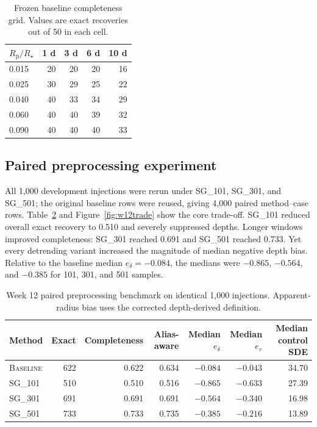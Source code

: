 \documentclass[11pt]{article}
\newcommand{\rprs}{$R_{\mathrm p}/R_\star$}
\newcommand{\sg}[1]{\textsc{SG\_#1}}
\newcommand{\baseline}{\textsc{Baseline}}
\begin{document}
\begin{table}[htbp]
\centering
\caption{Frozen baseline completeness grid. Values are exact recoveries out of 50 in each cell.}
\label{tab:w11grid}
\small
\begin{tabular}{lrrrr}
\toprule
\rprs & 1 d & 3 d & 6 d & 10 d\\
\midrule
0.015 & 20 & 20 & 20 & 16\\
0.025 & 30 & 29 & 25 & 22\\
0.040 & 40 & 33 & 34 & 29\\
0.060 & 40 & 40 & 39 & 32\\
0.090 & 40 & 40 & 40 & 33\\
\bottomrule
\end{tabular}
\end{table}

\subsection{Paired preprocessing experiment}
All 1,000 development injections were rerun under \sg{101}, \sg{301}, and \sg{501}; the original baseline rows were reused, giving 4,000 paired method--case rows. Table~\ref{tab:w12} and Figure~\ref{fig:w12trade} show the core trade-off. \sg{101} reduced overall exact recovery to 0.510 and severely suppressed depths. Longer windows improved completeness: \sg{301} reached 0.691 and \sg{501} reached 0.733. Yet every detrending variant increased the magnitude of median negative depth bias. Relative to the baseline median $e_\delta=-0.084$, the medians were $-0.865$, $-0.564$, and $-0.385$ for 101, 301, and 501 samples.

\begin{table}[htbp]
\centering
\caption{Week 12 paired preprocessing benchmark on identical 1,000 injections. Apparent-radius bias uses the corrected depth-derived definition.}
\label{tab:w12}
\small
\begin{tabular}{lrrrrrr}
\toprule
Method & Exact & Completeness & Alias-aware & Median $e_\delta$ & Median $e_r$ & Median control SDE\\
\midrule
\baseline & 622 & 0.622 & 0.634 & $-0.084$ & $-0.043$ & 34.70\\
\sg{101} & 510 & 0.510 & 0.516 & $-0.865$ & $-0.633$ & 27.39\\
\sg{301} & 691 & 0.691 & 0.691 & $-0.564$ & $-0.340$ & 16.98\\
\sg{501} & 733 & 0.733 & 0.735 & $-0.385$ & $-0.216$ & 13.89\\
\bottomrule
\end{tabular}
\end{table}
\end{document}
